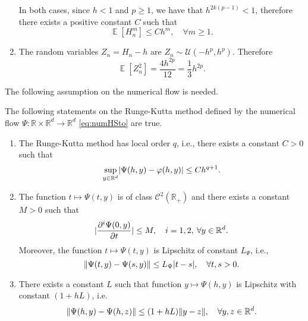 \documentclass{siamart1116}
\numberwithin{theorem}{section}
\DeclarePairedDelimiter{\abs}{\lvert}{\rvert}
\DeclarePairedDelimiter{\norm}{\|}{\|}
\renewcommand{\phi}{\varphi}
\newcommand{\R}{\mathbb{R}}
\newcommand{\E}{\operatorname{\mathbb{E}}}
\begin{document}
\begin{example}
\begin{enumerate}
\begin{equation}
		\end{equation}
		In both cases, since $h < 1$ and $p \geq 1$, we have that $h^{2k(p-1)} < 1$, therefore there exists a positive constant $C$ such that
		\begin{equation}
			\E[H_n^m] \leq Ch^m, \quad \forall m \geq 1.
		\end{equation}
		\item The random variables $Z_n = H_n - h$ are $Z_n \sim \mathcal{U}(-h^p, h^p)$. Therefore
		\begin{equation}
			\E[Z_n^2] = \frac{4h^{2p}}{12} = \frac{1}{3}h^{2p}.
		\end{equation}
	\end{enumerate}
\end{example}
\noindent The following assumption on the numerical flow is needed.
\begin{assumption}\label{as:PsiStrong} The following statements on the Runge-Kutta method defined by the numerical flow $\Psi\colon\R\times\R^d\to\R^d$ \eqref{eq:numHSto} are true.
	\begin{enumerate}[label=(\roman*),topsep=5pt]
		\item\label{as:PsiStrong_Order} The Runge-Kutta method has local order $q$, i.e., there exists a constant $C > 0$ such that
			\begin{equation}
				\sup_{y\in\R^d} \abs{\Psi(h, y) - \phi(h, y)} \leq Ch^{q+1}.
			\end{equation}
		\item\label{as:PsiStrong_Time} The function $t \mapsto \Psi(t, y)$ is of class $\mathcal{C}^2(\R_+)$ and there exists a constant $M > 0$ such that 
			\begin{equation}
				\abs{\frac{\partial^i\Psi(0, y)}{\partial t}} \leq M, \quad i = 1, 2, \: \forall y \in \R^d.
			\end{equation} 
			Moreover, the function $t \mapsto \Psi(t, y)$ is Lipschitz of constant $L_\Psi$, i.e., 
			\begin{equation}\label{eq:LipschitzPsiT}
				\norm{\Psi(t, y) - \Psi(s, y)} \leq L_\Psi \abs{t - s}, \quad \forall t, s > 0.
			\end{equation}
		\item\label{as:PsiStrong_Space} There exists a constant $L$ such that function $y \mapsto \Psi(h, y)$ is Lipschitz with constant $(1 + hL)$, i.e.
			\begin{equation}\label{eq:LipschitzPsiY}
				\norm{\Psi(h, y) - \Psi(h, z)} \leq (1 + hL) \norm{y - z}, \quad \forall y, z \in \R^d.
			\end{equation}
	\end{enumerate}
\end{assumption}
\end{document}
